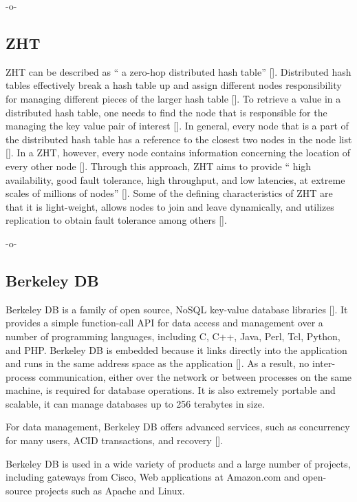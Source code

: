      -o-

\subsection{ZHT}

ZHT can be described as `` a zero-hop distributed hash
table'' [\cite{datasys}]. Distributed hash tables effectively break a
hash table up and assign different nodes responsibility for managing
different pieces of the larger hash table [\cite{wiley}]. To retrieve a
value in a distributed hash table, one needs to find the node that is
responsible for the managing the key value pair of
interest [\cite{wiley}]. In general, every node that is a part of the
distributed hash table has a reference to the closest two nodes in the
node list [\cite{wiley}]. In a ZHT, however, every node contains
information concerning the location of every other
node [\cite{Li}]. Through this approach, ZHT aims to provide `` high
availability, good fault tolerance, high throughput, and low
latencies, at extreme scales of millions of nodes'' [\cite{Li}].  Some
of the defining characteristics of ZHT are that it is light-weight,
allows nodes to join and leave dynamically, and utilizes replication
to obtain fault tolerance among others [\cite{Li}].

     -o-
     
\subsection{Berkeley DB}

Berkeley DB is a family of open source, NoSQL key-value database
libraries [\cite{www-bdb-wiki}]. It provides a simple function-call API
for data access and management over a number of programming languages,
including C, C++, Java, Perl, Tcl, Python, and PHP. Berkeley DB is
embedded because it links directly into the application and runs in
the same address space as the application [\cite{www-bdb-stanford}]. As
a result, no inter-process communication, either over the network or
between processes on the same machine, is required for database
operations. It is also extremely portable and scalable, it can manage
databases up to 256 terabytes in size.
     
For data management, Berkeley DB offers advanced services, such as
concurrency for many users, ACID transactions, and
recovery [\cite{www-bdb}].
     
Berkeley DB is used in a wide variety of products and a large number
of projects, including gateways from Cisco, Web applications at
Amazon.com and open-source projects such as Apache and Linux.

